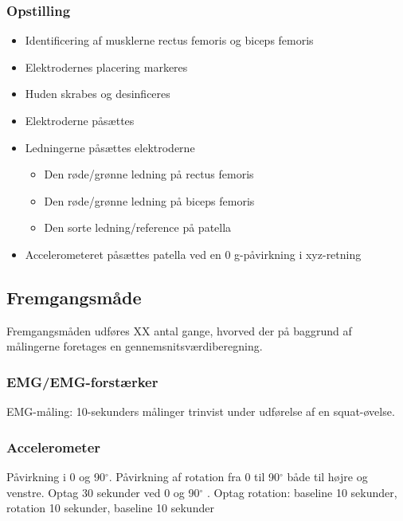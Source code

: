 \subsubsection{Opstilling}
\begin{itemize}
\item Identificering af musklerne rectus femoris og biceps femoris 
\item Elektrodernes placering markeres
\item Huden skrabes og desinficeres
\item Elektroderne påsættes
\item Ledningerne påsættes elektroderne
\begin{itemize}
\item Den røde/grønne ledning på rectus femoris
\item Den røde/grønne ledning på biceps femoris
\item Den sorte ledning/reference på patella 

\end{itemize} 
\item Accelerometeret påsættes patella ved en 0 g-påvirkning i xyz-retning
\end{itemize}

\subsection{Fremgangsmåde}
Fremgangsmåden udføres XX antal gange, hvorved der på baggrund af målingerne foretages en gennemsnitsværdiberegning.

\subsubsection{EMG/EMG-forstærker}
EMG-måling: 10-sekunders målinger trinvist under udførelse af en squat-øvelse. 


\subsubsection{Accelerometer}
Påvirkning i 0 og 90$^{\circ}$.
Påvirkning af rotation fra 0 til 90$^{\circ}$ både til højre og venstre.
Optag 30 sekunder ved 0 og 90$^{\circ}$ .
Optag rotation: baseline 10 sekunder, rotation 10 sekunder, baseline 10 sekunder



